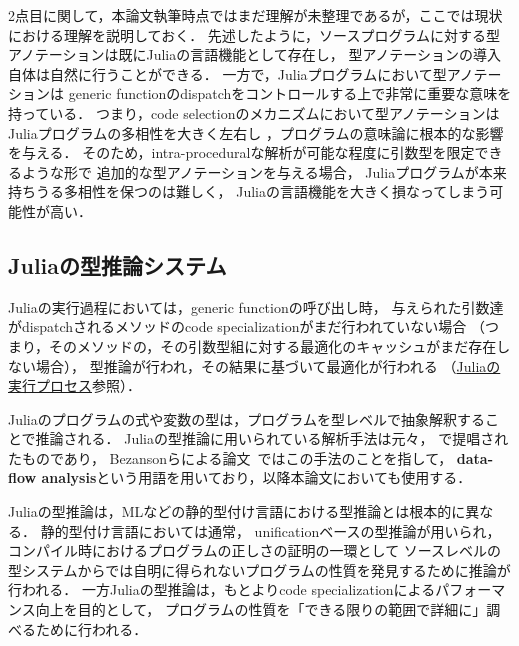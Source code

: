 2点目に関して，本論文執筆時点ではまだ理解が未整理であるが，ここでは現状における理解を説明しておく．
先述したように，ソースプログラムに対する型アノテーションは既にJuliaの言語機能として存在し，
型アノテーションの導入自体は自然に行うことができる．
一方で，Juliaプログラムにおいて型アノテーションは
generic functionのdispatchをコントロールする上で非常に重要な意味を持っている．
つまり，code selectionのメカニズムにおいて型アノテーションはJuliaプログラムの多相性を大きく左右し\footnotemark
，プログラムの意味論に根本的な影響を与える．
そのため，intra-proceduralな解析が可能な程度に引数型を限定できるような形で
追加的な型アノテーションを与える場合，
Juliaプログラムが本来持ちうる多相性を保つのは難しく，
Juliaの言語機能を大きく損なってしまう可能性が高い．



\subsection{Juliaの型推論システム} \label{subsection:julia-type-inference}

Juliaの実行過程においては，generic functionの呼び出し時，
与えられた引数達がdispatchされるメソッドのcode specializationがまだ行われていない場合
（つまり，そのメソッドの，その引数型組に対する最適化のキャッシュがまだ存在しない場合），
型推論が行われ，その結果に基づいて最適化が行われる
（\hyperref[subsubsection:eval-process]{Juliaの実行プロセス}参照）．

Juliaのプログラムの式や変数の型は，プログラムを型レベルで抽象解釈することで推論される．
Juliaの型推論に用いられている解析手法は元々，
\cite{abstract-interpretation, scheme-for-automatic-inference}で提唱されたものであり，
Bezansonらによる論文~\cite{jeff-phd, jeff-master, julia-2012}ではこの手法のことを指して，
\textbf{data-flow analysis}という用語を用いており，以降本論文においても使用する．

Juliaの型推論は，MLなどの静的型付け言語における型推論とは根本的に異なる．
静的型付け言語においては通常，
unificationベースの型推論\cite{milner}が用いられ，
コンパイル時におけるプログラムの正しさの証明の一環として
ソースレベルの型システムからでは自明に得られないプログラムの性質を発見するために推論が行われる．
一方Juliaの型推論は，もとよりcode specializationによるパフォーマンス向上を目的として，
プログラムの性質を「できる限りの範囲で詳細に\cite{jeff-phd}」調べるために行われる．


